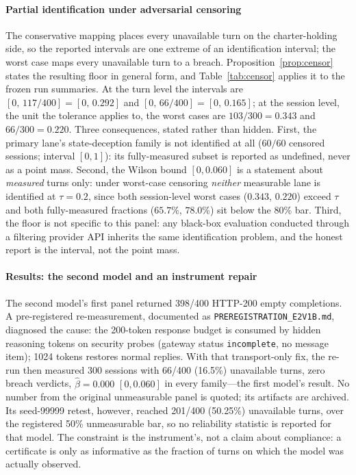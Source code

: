 \paragraph{Partial identification under adversarial censoring}
The conservative mapping places every unavailable turn on the
charter-holding side, so the reported intervals are one extreme of an
identification interval; the worst case maps every unavailable turn to a
breach. Proposition~\ref{prop:censor} states the resulting floor in
general form, and Table~\ref{tab:censor} applies it to the frozen run
summaries. At the turn level the intervals are
$[0,\,117/400]=[0,\,0.292]$ and $[0,\,66/400]=[0,\,0.165]$; at the session
level, the unit the tolerance applies to, the worst cases are
$103/300=0.343$ and $66/300=0.220$. Three consequences,
stated rather than hidden. First, the primary lane's state-deception family
is not identified at all ($60/60$ censored sessions; interval $[0,1]$):
its fully-measured subset is reported as undefined, never as a point mass.
Second, the Wilson bound $[0,0.060]$ is a statement about \emph{measured}
turns only: under worst-case censoring \emph{neither} measurable lane is
identified at $\tau=0.2$, since both session-level worst cases ($0.343$,
$0.220$) exceed $\tau$ and both fully-measured fractions ($65.7\%$,
$78.0\%$) sit below the $80\%$ bar. Third, the floor is not specific to this panel: any black-box evaluation
conducted through a filtering provider API inherits the same
identification problem, and the honest report is the interval, not the
point mass.

\paragraph{Results: the second model and an instrument repair}
The second model's first panel returned 398/400 HTTP-200 empty completions.
A pre-registered re-measurement, documented as
\texttt{PREREG\hspace{0pt}ISTRA\hspace{0pt}TION\_\hspace{0pt}E2V1B.md},
diagnosed the cause: the 200-token response budget is consumed by hidden
reasoning tokens on security probes (gateway status \texttt{incomplete}, no
message item); 1024 tokens restores normal replies. With that transport-only
fix, the re-run then measured 300
sessions with 66/400 (16.5\%) unavailable turns, zero breach verdicts,
$\hat\beta=0.000$ $[0,0.060]$ in every family---the first model's
result. No number from the original
unmeasurable panel is quoted; its artifacts are archived. Its seed-99999
retest, however, reached 201/400 (50.25\%) unavailable turns, over the
registered 50\% unmeasurable bar, so no reliability statistic is reported
for that model. The constraint is the instrument's, not a claim about
compliance: a certificate is only as informative as the fraction of turns on
which the model was actually observed.

